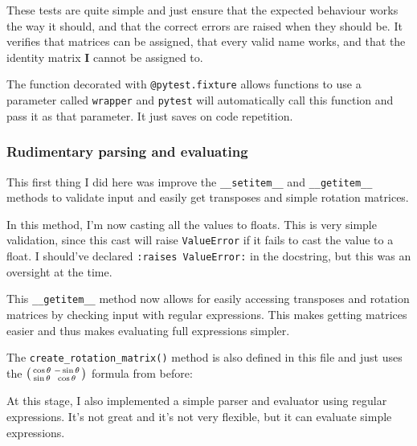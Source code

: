\documentclass[../main.tex]{subfiles}
\begin{document}

These tests are quite simple and just ensure that the expected behaviour works the way it should, and that the correct errors are raised when they should be. It verifies that matrices can be assigned, that every valid name works, and that the identity matrix \textbf{I} cannot be assigned to.

The function decorated with \texttt{@pytest.fixture} allows functions to use a parameter called \texttt{wrapper} and \texttt{pytest} will automatically call this function and pass it as that parameter. It just saves on code repetition.

\subsubsection{Rudimentary parsing and evaluating}

This first thing I did here was improve the \texttt{\_\_setitem\_\_} and \texttt{\_\_getitem\_\_} methods to validate input and easily get transposes and simple rotation matrices.


In this method, I'm now casting all the values to floats. This is very simple validation, since this cast will raise \texttt{ValueError} if it fails to cast the value to a float. I should've declared \texttt{:raises ValueError:} in the docstring, but this was an oversight at the time.


This \texttt{\_\_getitem\_\_} method now allows for easily accessing transposes and rotation matrices by checking input with regular expressions. This makes getting matrices easier and thus makes evaluating full expressions simpler.

The \texttt{create\_rotation\_matrix()} method is also defined in this file and just uses the $\begin{psmallmatrix}\cos\theta & -\sin\theta\\\sin\theta & \cos\theta\end{psmallmatrix}$ formula from before:


At this stage, I also implemented a simple parser and evaluator using regular expressions. It's not great and it's not very flexible, but it can evaluate simple expressions.
\end{document}
